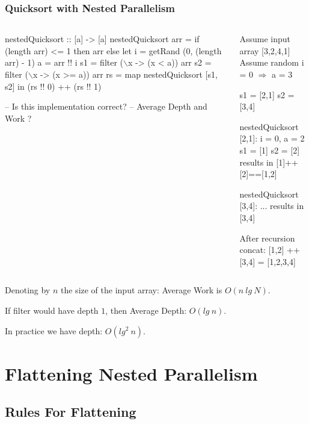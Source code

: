 \documentclass{beamer}
\newcommand{\emp}[1]{\textcolor{DikuRed}{ #1}}
\newcommand{\mymath}[1]{$ #1 $}
\begin{document}
\begin{frame}[fragile,t]
  \frametitle{Quicksort with Nested Parallelism}

\begin{columns}
\begin{colorcode}[fontsize=\scriptsize]
nestedQuicksort :: [a] -> [a]
nestedQuicksort arr = 
  if (length arr) <= 1 then arr else 
  let i = getRand (0, (length arr) - 1)
      a = arr !! i
      s1 = filter (\mymath{\backslash}x -> (x <  a)) arr
      s2 = filter (\mymath{\backslash}x -> (x >= a)) arr
      rs = map nestedQuicksort [s1, s2]
  in  (rs !! 0) ++ (rs !! 1)

-- \alert{Is this implementation correct?}
-- \alert{Average Depth and Work ?}
\end{colorcode}
\pause
\begin{colorcode}[fontsize=\scriptsize]
Assume input array [3,2,4,1]
Assume random i = 0 \mymath{\Rightarrow} a = 3

s1 = [2,1]
s2 = [3,4]

\emp{nestedQuicksort [2,1]}:
i = 0, a = 2
s1 = [1]
s2 = [2]
results in [1]++[2]==[1,2]

\emp{nestedQuicksort [3,4]}: ...
results in [3,4]

\emp{After recursion concat:}
[1,2] ++ [3,4] = [1,2,3,4]
\end{colorcode}
\end{columns}
\medskip

Denoting by $n$ the size of the input array: Average Work is $O(n \ lg \ N)$.\\
\medskip

If filter would have depth $1$, then Average Depth: $O(lg \ n)$.
\medskip

In practice we have depth: $O(lg^2 \ n)$.

\end{frame}

\section{Flattening Nested Parallelism}

\begin{frame}[fragile]
	\tableofcontents[currentsection]
\end{frame}

\subsection{Rules For Flattening}
\end{document}
